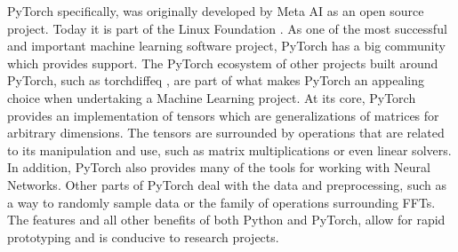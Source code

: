 PyTorch specifically, was originally developed by Meta AI as an open source project. Today it is part of the Linux Foundation \autocite{jimzemlinWelcomingPyTorchLinux2022}. As one of the most successful and important machine learning software project, PyTorch has a big community which provides support. The PyTorch ecosystem of other projects built around PyTorch, such as torchdiffeq \autocite{Chen_torchdiffeq_2021}, are part of what makes PyTorch an appealing choice when undertaking a Machine Learning project. At its core, PyTorch provides an implementation of tensors which are generalizations of matrices for arbitrary dimensions. The tensors are surrounded by operations that are related to its manipulation and use, such as matrix multiplications or even linear solvers. In addition, PyTorch also provides many of the tools for working with Neural Networks. Other parts of PyTorch deal with the data and preprocessing, such as a way to randomly sample data or the family of operations surrounding FFTs. The features and all other benefits of both Python and PyTorch, allow for rapid prototyping and is conducive to research projects.




